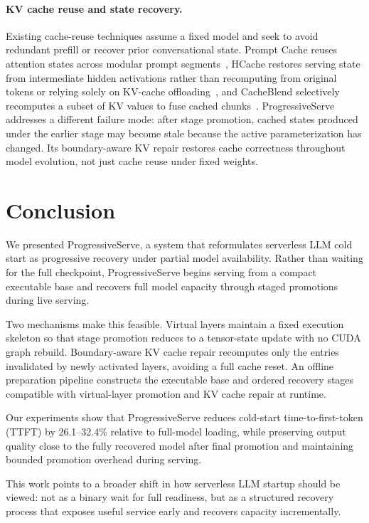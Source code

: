 \documentclass[sigplan,anonymous,review,nonacm]{acmart}
\begin{document}
\paragraph{KV cache reuse and state recovery.}
Existing cache-reuse techniques assume a fixed model and seek to avoid redundant prefill or recover prior conversational state. Prompt Cache reuses attention states across modular prompt segments~\cite{gim2024promptcache}, HCache restores serving state from intermediate hidden activations rather than recomputing from original tokens or relying solely on KV-cache offloading~\cite{hcache_eurosys25}, and CacheBlend selectively recomputes a subset of KV values to fuse cached chunks~\cite{cacheblend_eurosys25}. ProgressiveServe addresses a different failure mode: after stage promotion, cached states produced under the earlier stage may become stale because the active parameterization has changed. Its boundary-aware KV repair restores cache correctness throughout model evolution, not just cache reuse under fixed weights.


\section{Conclusion}
We presented ProgressiveServe, a system that reformulates serverless LLM cold start as progressive recovery under partial model availability. Rather than waiting for the full checkpoint, ProgressiveServe begins serving from a compact executable base and recovers full model capacity through staged promotions during live serving.

Two mechanisms make this feasible. Virtual layers maintain a fixed execution skeleton so that stage promotion reduces to a tensor-state update with no CUDA graph rebuild. Boundary-aware KV cache repair recomputes only the entries invalidated by newly activated layers, avoiding a full cache reset. An offline preparation pipeline constructs the executable base and ordered recovery stages compatible with virtual-layer promotion and KV cache repair at runtime.


Our experiments show that ProgressiveServe reduces cold-start time-to-first-token (TTFT) by 26.1--32.4\% relative to full-model loading, while preserving output quality close to the fully recovered model after final promotion and maintaining bounded promotion overhead during serving.

This work points to a broader shift in how serverless LLM startup should be viewed: not as a binary wait for full readiness, but as a structured recovery process that exposes useful service early and recovers capacity incrementally.
\end{document}

